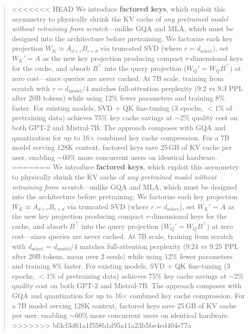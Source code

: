 \documentclass{article} %
\newcommand{\dmodel}{d_{\text{model}}}
\newcommand{\dselect}{d_{\text{select}}}
\begin{document}
\begin{abstract}
<<<<<<< HEAD
We introduce \textbf{factored keys}, which exploit this asymmetry to physically shrink the KV cache of \emph{any pretrained model without retraining from scratch}---unlike GQA and MLA, which must be designed into the architecture before pretraining. We factorize each key projection $W_K \approx A_{d \times r} B_{r \times d}$ via truncated SVD (where $r = \dselect$), set $W_K' = A$ as the new key projection producing compact $r$-dimensional keys for the cache, and absorb $B^\top$ into the query projection ($W_Q' = W_Q B^\top$) at zero cost---since queries are never cached. At 7B scale, training from scratch with $r = \dmodel/4$ matches full-attention perplexity (9.2 vs 9.3 PPL after 20B tokens) while using 12\% fewer parameters and training 8\% faster. For existing models, SVD + QK fine-tuning (3 epochs, $<$1\% of pretraining data) achieves 75\% key cache savings at $\sim$2\% quality cost on both GPT-2 and Mistral-7B. The approach composes with GQA and quantization for up to 16$\times$ combined key cache compression. For a 7B model serving 128K context, factored keys save 25\,GB of KV cache per user, enabling $\sim$60\% more concurrent users on identical hardware.
=======
We introduce \textbf{factored keys}, which exploit this asymmetry to physically shrink the KV cache of \emph{any pretrained model without retraining from scratch}---unlike GQA and MLA, which must be designed into the architecture before pretraining. We factorize each key projection $W_K \approx A_{d \times r} B_{r \times d}$ via truncated SVD (where $r = \dselect$), set $W_K' = A$ as the new key projection producing compact $r$-dimensional keys for the cache, and absorb $B^\top$ into the query projection ($W_Q' = W_Q B^\top$) at zero cost---since queries are never cached. At 7B scale, training from scratch with $\dselect = \dmodel/4$ matches full-attention perplexity ($9.24$ vs $9.25$ PPL after 20B tokens, mean over 2 seeds) while using 12\% fewer parameters and training 8\% faster. For existing models, SVD + QK fine-tuning (3 epochs, $<$1\% of pretraining data) achieves 75\% key cache savings at $\sim$2\% quality cost on both GPT-2 and Mistral-7B. The approach composes with GQA and quantization for up to 16$\times$ combined key cache compression. For a 7B model serving 128K context, factored keys save 25\,GB of KV cache per user, enabling $\sim$60\% more concurrent users on identical hardware.
>>>>>>> bf3cf3d61a1f558b1d95a11a23b5be4ed404e77a
\end{abstract}

\end{document}
